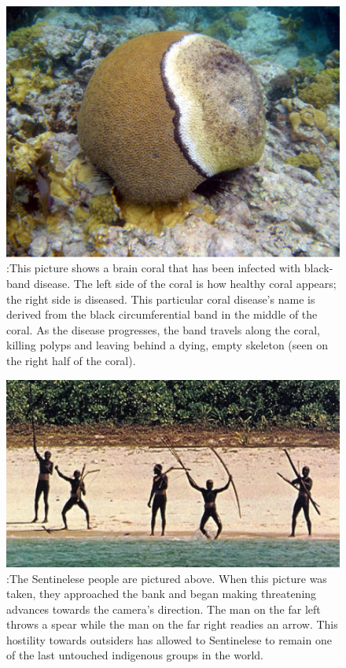 \documentclass{book}\usepackage{knitr}
\begin{document}
\begin{knitrout}
\begin{kframe}
\begin{figure}
\includegraphics[width=\linewidth]{images/coraldisease}
\caption{:This picture shows a brain coral that has been infected with black-band disease. The left side of the coral is how healthy coral appears; the right side is diseased. This particular coral disease’s name is derived from the black circumferential band in the middle of the coral. As the disease progresses, the band travels along the coral, killing polyps and leaving behind a dying, empty skeleton (seen on the right half of the coral).}
\label{fig:Black Band Disease}
\end{figure}

\begin{figure}
\includegraphics[width=\linewidth]{images/sentpeeps}
\caption{:The Sentinelese people are pictured above. When this picture was taken, they approached the bank and began making threatening advances towards the camera’s direction. The man on the far left throws a spear while the man on the far right readies an arrow. This hostility towards outsiders has allowed to Sentinelese to remain one of the last untouched indigenous groups in the world.}
\label{fig:An Interaction with The Sentinelese People }
\end{figure}


\end{kframe}
\end{knitrout}
\end{document}
